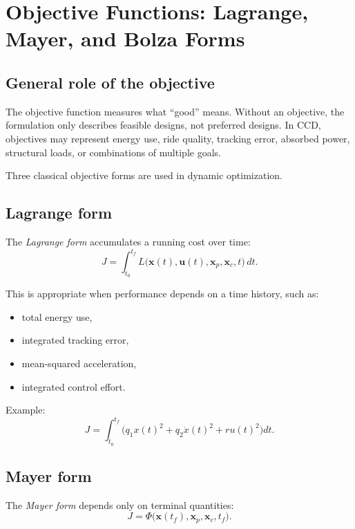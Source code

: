 \documentclass[11pt]{article}
\newcommand{\vect}[1]{\boldsymbol{#1}}
\newcommand{\xp}{\vect{x}_p}
\newcommand{\xc}{\vect{x}_c}
\newcommand{\xstate}{\vect{x}}
\newcommand{\uvec}{\vect{u}}
\begin{document}
\section{Objective Functions: Lagrange, Mayer, and Bolza Forms}

\subsection{General role of the objective}

The objective function measures what ``good'' means. Without an objective, the formulation only describes feasible designs, not preferred designs. In CCD, objectives may represent energy use, ride quality, tracking error, absorbed power, structural loads, or combinations of multiple goals.

Three classical objective forms are used in dynamic optimization.

\subsection{Lagrange form}

The \emph{Lagrange form} accumulates a running cost over time:
\begin{equation}
J = \int_{t_0}^{t_f} L\big(\xstate(t),\uvec(t),\xp,\xc,t\big)\,dt.
\label{eq:ch4-lagrange}
\end{equation}

This is appropriate when performance depends on a time history, such as:
\begin{itemize}[leftmargin=1.4em]
  \item total energy use,
  \item integrated tracking error,
  \item mean-squared acceleration,
  \item integrated control effort.
\end{itemize}

Example:
\begin{equation}
J = \int_{t_0}^{t_f} \big(q_1 x(t)^2 + q_2 \dot{x}(t)^2 + r u(t)^2\big)dt.
\end{equation}

\subsection{Mayer form}

The \emph{Mayer form} depends only on terminal quantities:
\begin{equation}
J = \Phi\big(\xstate(t_f),\xp,\xc,t_f\big).
\label{eq:ch4-mayer}
\end{equation}
\end{document}
